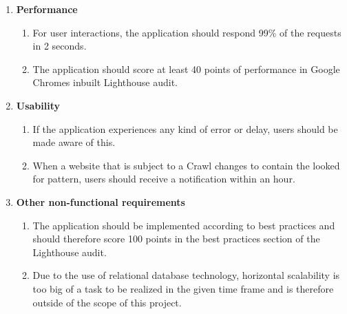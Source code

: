 \documentclass[titlepage, 12pt]{article}
\begin{document}
\begin{enumerate}
  \item \textbf{Performance}
        \begin{enumerate}
          \item For user interactions, the application should respond 99\% of the requests in 2 seconds.
          \item The application should score at least 40 points of performance in Google Chromes inbuilt Lighthouse audit.
        \end{enumerate}
  \item \textbf{Usability}
        \begin{enumerate}
          \item If the application experiences any kind of error or delay, users should be made aware of this.
          \item When a website that is subject to a Crawl changes to contain the looked for pattern, users should receive a notification within an hour.
        \end{enumerate}
  \item \textbf{Other non-functional requirements}
        \begin{enumerate}
          \item The application should be implemented according to best practices and should therefore score 100 points in the best practices section of the Lighthouse audit.
          \item Due to the use of relational database technology, horizontal scalability is too big of a task to be realized in the given time frame and is therefore outside of the scope of this project.
        \end{enumerate}
\end{enumerate}

\pagebreak

\listoftables

\pagebreak



\end{document}

